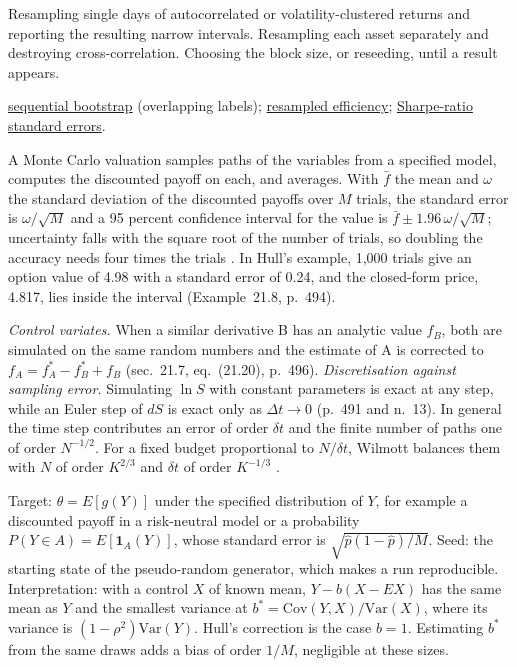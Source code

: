 \begin{qfmethod}
 Resampling single days of autocorrelated or volatility-clustered returns and reporting the resulting narrow intervals. Resampling each asset separately and destroying cross-correlation. Choosing the block size, or reseeding, until a result appears.

 \hyperref[meth:sequential-bootstrap]{sequential bootstrap} (overlapping labels); \hyperref[meth:resampled-efficiency]{resampled efficiency}; \hyperref[meth:sharpe-ratio-standard-error]{Sharpe-ratio standard errors}.

\end{qfmethod}

\begin{qfmethod}\label{meth:monte-carlo-simulation}
 A Monte Carlo valuation samples paths of the variables from a specified model, computes the discounted payoff on each, and averages. With $\bar f$ the mean and $\omega$ the standard deviation of the discounted payoffs over $M$ trials, the standard error is $\omega/\sqrt M$ and a 95 percent confidence interval for the value is $\bar f\pm1.96\,\omega/\sqrt M$; uncertainty falls with the square root of the number of trials, so doubling the accuracy needs four times the trials \citep[chap.~21, sec.~21.6, pp.~492--494]{s7-hulloptions}. In Hull's example, 1{,}000 trials give an option value of 4.98 with a standard error of 0.24, and the closed-form price, 4.817, lies inside the interval (Example~21.8, p.~494).

\emph{Control variates.} When a similar derivative B has an analytic value $f_B$, both are simulated on the same random numbers and the estimate of A is corrected to $f_A=f_A^*-f_B^*+f_B$ (sec.~21.7, eq.~(21.20), p.~496). \emph{Discretisation against sampling error.} Simulating $\ln S$ with constant parameters is exact at any step, while an Euler step of $dS$ is exact only as $\Delta t\to0$ (p.~491 and n.~13). In general the time step contributes an error of order $\delta t$ and the finite number of paths one of order $N^{-1/2}$. For a fixed budget proportional to $N/\delta t$, Wilmott balances them with $N$ of order $K^{2/3}$ and $\delta t$ of order $K^{-1/3}$ \citep[chap.~80, secs.~80.4--80.6, pp.~1266--1268]{wide-wilmott-pwoqf}.

 Target: $\theta=E[g(Y)]$ under the specified distribution of $Y$, for example a discounted payoff in a risk-neutral model or a probability $P(Y\in A)=E[\mathbf 1_A(Y)]$, whose standard error is $\sqrt{\hat p(1-\hat p)/M}$. Seed: the starting state of the pseudo-random generator, which makes a run reproducible. Interpretation: with a control $X$ of known mean, $Y-b(X-E X)$ has the same mean as $Y$ and the smallest variance at $b^*=\mathrm{Cov}(Y,X)/\mathrm{Var}(X)$, where its variance is $(1-\rho^2)\mathrm{Var}(Y)$. Hull's correction is the case $b=1$. Estimating $b^*$ from the same draws adds a bias of order $1/M$, negligible at these sizes.


\end{qfmethod}
